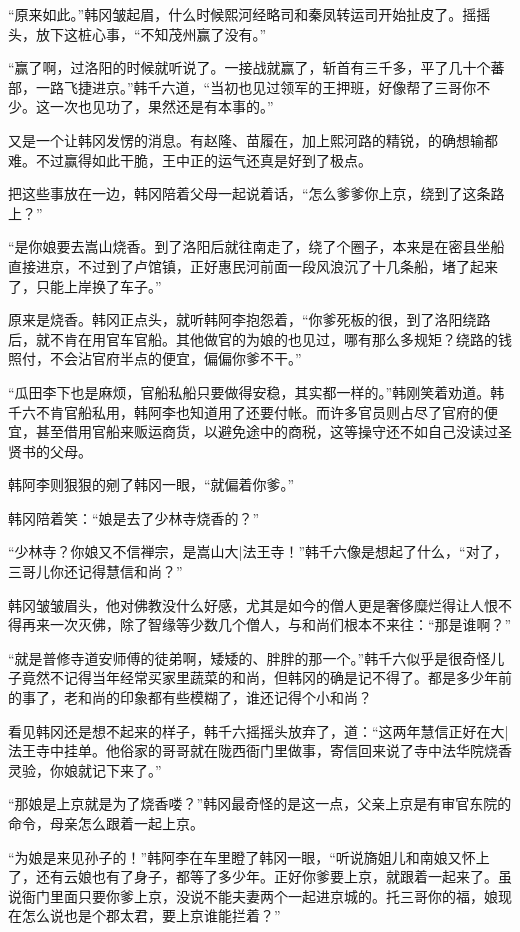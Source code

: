 “原来如此。”韩冈皱起眉，什么时候熙河经略司和秦凤转运司开始扯皮了。摇摇头，放下这桩心事，“不知茂州赢了没有。”

“赢了啊，过洛阳的时候就听说了。一接战就赢了，斩首有三千多，平了几十个蕃部，一路飞捷进京。”韩千六道，“当初也见过领军的王押班，好像帮了三哥你不少。这一次也见功了，果然还是有本事的。”

又是一个让韩冈发愣的消息。有赵隆、苗履在，加上熙河路的精锐，的确想输都难。不过赢得如此干脆，王中正的运气还真是好到了极点。

把这些事放在一边，韩冈陪着父母一起说着话，“怎么爹爹你上京，绕到了这条路上？”

“是你娘要去嵩山烧香。到了洛阳后就往南走了，绕了个圈子，本来是在密县坐船直接进京，不过到了卢馆镇，正好惠民河前面一段风浪沉了十几条船，堵了起来了，只能上岸换了车子。”

原来是烧香。韩冈正点头，就听韩阿李抱怨着，“你爹死板的很，到了洛阳绕路后，就不肯在用官车官船。其他做官的为娘的也见过，哪有那么多规矩？绕路的钱照付，不会沾官府半点的便宜，偏偏你爹不干。”

“瓜田李下也是麻烦，官船私船只要做得安稳，其实都一样的。”韩刚笑着劝道。韩千六不肯官船私用，韩阿李也知道用了还要付帐。而许多官员则占尽了官府的便宜，甚至借用官船来贩运商货，以避免途中的商税，这等操守还不如自己没读过圣贤书的父母。

韩阿李则狠狠的剜了韩冈一眼，“就偏着你爹。”

韩冈陪着笑：“娘是去了少林寺烧香的？”

“少林寺？你娘又不信禅宗，是嵩山大|法王寺！”韩千六像是想起了什么，“对了，三哥儿你还记得慧信和尚？”

韩冈皱皱眉头，他对佛教没什么好感，尤其是如今的僧人更是奢侈糜烂得让人恨不得再来一次灭佛，除了智缘等少数几个僧人，与和尚们根本不来往：“那是谁啊？”

“就是普修寺道安师傅的徒弟啊，矮矮的、胖胖的那一个。”韩千六似乎是很奇怪儿子竟然不记得当年经常买家里蔬菜的和尚，但韩冈的确是记不得了。都是多少年前的事了，老和尚的印象都有些模糊了，谁还记得个小和尚？

看见韩冈还是想不起来的样子，韩千六摇摇头放弃了，道：“这两年慧信正好在大|法王寺中挂单。他俗家的哥哥就在陇西衙门里做事，寄信回来说了寺中法华院烧香灵验，你娘就记下来了。”

“那娘是上京就是为了烧香喽？”韩冈最奇怪的是这一点，父亲上京是有审官东院的命令，母亲怎么跟着一起上京。

“为娘是来见孙子的！”韩阿李在车里瞪了韩冈一眼，“听说旖姐儿和南娘又怀上了，还有云娘也有了身子，都等了多少年。正好你爹要上京，就跟着一起来了。虽说衙门里面只要你爹上京，没说不能夫妻两个一起进京城的。托三哥你的福，娘现在怎么说也是个郡太君，要上京谁能拦着？”

